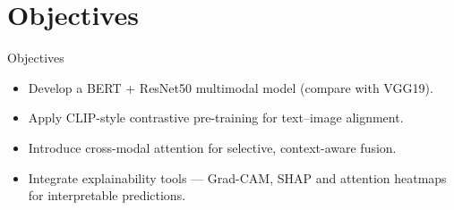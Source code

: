 \documentclass[xcolor=dvipsnames,aspectratio=169]{beamer}
\begin{document}
\section{Objectives}


\begin{frame}{Objectives}
		
        \begin{itemize}
		
        \item Develop a BERT + ResNet50 multimodal model (compare with VGG19).\\

        \item Apply CLIP-style contrastive pre-training for text–image alignment.\\

        \item Introduce cross-modal attention for selective, context-aware fusion.\\

        \item Integrate explainability tools — Grad-CAM, SHAP and attention heatmaps for interpretable predictions.
		
		\end{itemize}
    
\end{frame}



\end{document}
